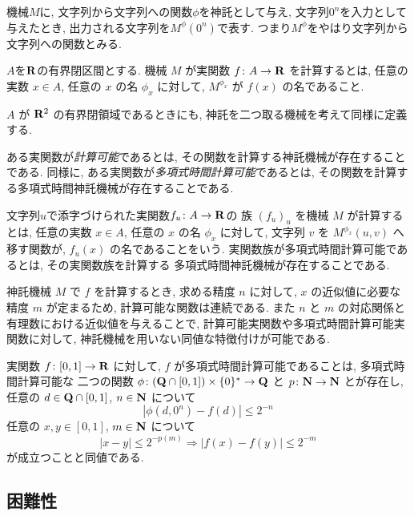 機械$M$に, 
文字列から文字列への関数$\phi$を神託として与え, 
文字列$0 ^n$を入力として与えたとき, 
出力される文字列を$M ^\phi (0 ^n)$で表す. 
つまり$M ^\phi$をやはり文字列から文字列への関数とみる. 

\begin{definition}
$A$を$\mathbf R$の有界閉区間とする. 
機械 $M$ が実関数 $f \colon A \to \mathbf R$ を計算するとは,
任意の実数 $x \in A$, 任意の $x$ の名 $\phi_x$ に対して,
$M^{\phi_x}$ が $f(x)$ の名であること.
\end{definition}

$A$ が $\mathbf R ^2$ の有界閉領域であるときにも, 
神託を二つ取る機械を考えて同様に定義する. 


 ある実関数が\emph{計算可能}であるとは, その関数を計算する神託機械が存在することである.
 同様に, ある実関数が\emph{多項式時間計算可能}であるとは, その関数を計算する多項式時間神託機械が存在することである.

文字列$u$で添字づけられた実関数$f _u \colon A \to \mathbf R$の
族 $(f_u)_u$ を機械 $M$ が計算するとは,
任意の実数 $x \in A$, 任意の $x$ の名 $\phi_x$ に対して,
文字列 $v$ を $M ^{\phi _x} (u, v)$ へ移す関数が, 
$f _u (x)$ の名であることをいう.
 実関数族が多項式時間計算可能であるとは, その実関数族を計算する
 多項式時間神託機械が存在することである.

 神託機械 $M$ で $f$ を計算するとき, 求める精度 $n$ に対して,
 $x$ の近似値に必要な精度 $m$ が定まるため,
 計算可能な関数は連続である.
 また $n$ と $m$ の対応関係と有理数における近似値を与えることで,
 計算可能実関数や多項式時間計算可能実関数に対して,
 神託機械を用いない同値な特徴付けが可能である.

\begin{lemma}
  \label{lem:type1representation}
  実関数 $f\colon [0,1] \to \mathbf R$ に対して,
  $f$ が多項式時間計算可能であることは, 
  多項式時間計算可能な
  二つの関数 $\phi \colon (\mathbf Q \cap [0, 1]) \times \{0\}^* \to \mathbf Q$ と
  $p \colon \mathbf N \to \mathbf N$ とが存在し, 
  任意の $d \in \mathbf Q \cap [0,1]$, $n \in \mathbf N$ について
  \begin{equation}
   |\phi(d, 0^n) - f(d)| \le 2^{-n} 
  \end{equation}
  任意の $x, y \in [0, 1]$, $m \in \mathbf N$ について
  \begin{equation}
   |x-y| \le 2^{-p(m)} \Rightarrow |f(x) - f(y)| \le 2^{-m} 
  \end{equation}
  が成立つことと同値である. 
\end{lemma}



\subsection{困難性}

